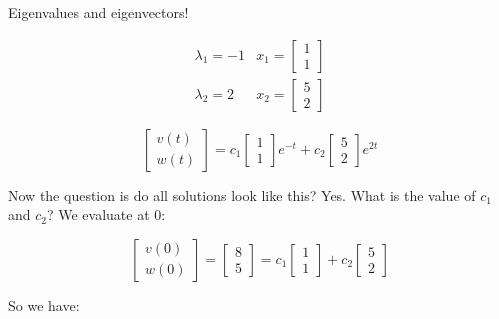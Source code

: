 Eigenvalues and eigenvectors!

\[
  \begin{matrix}
    \lambda_1 = -1 & x_1 = \begin{bmatrix}
      1 \\ 1
    \end{bmatrix} \\
    \lambda_2 = 2 & x_2 = \begin{bmatrix}
      5 \\ 2
    \end{bmatrix}
  \end{matrix}
\]

\[
  \begin{bmatrix}
    v(t) \\ w(t)
  \end{bmatrix}
  =
  c_1 \begin{bmatrix}
    1 \\ 1
  \end{bmatrix}
  e^{-t}
  +
  c_2
  \begin{bmatrix}
    5 \\ 2
  \end{bmatrix}
  e^{2t}
\]

Now the question is do all solutions look like this? Yes. What is the value of $c_1$ and $c_2$? We evaluate at 0:

\[
  \begin{bmatrix}
    v(0) \\ w(0)
  \end{bmatrix}
  =
  \begin{bmatrix}
    8 \\ 5
  \end{bmatrix}
  =
  c_1 \begin{bmatrix}
    1 \\ 1
  \end{bmatrix}
  +
  c_2
  \begin{bmatrix}
    5 \\ 2
  \end{bmatrix}
\]

So we have:

